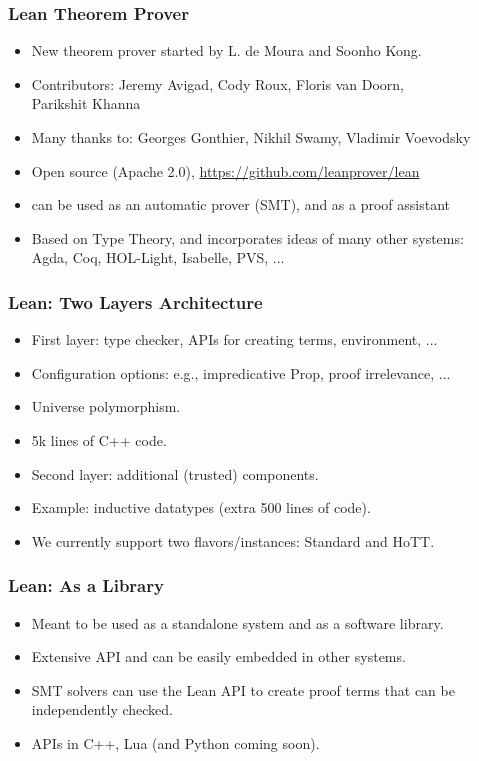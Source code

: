 \documentclass[svgnames,table,mathserif]{beamer}
\begin{document}
\begin{frame}
\frametitle{Lean Theorem Prover}
  \begin{itemize}
    \item New theorem prover started by L. de Moura and Soonho Kong.
    \item {\small Contributors: Jeremy Avigad, Cody Roux, Floris van Doorn,\\ Parikshit Khanna}
    \item {\small Many thanks to: Georges Gonthier, Nikhil Swamy, Vladimir Voevodsky}
  \end{itemize}
  \vspace*{12pt}
  \begin{itemize}
    \item Open source (Apache 2.0), {\small \url{https://github.com/leanprover/lean}}
    \item {\color{red} can be used as an automatic prover (SMT), and as a proof assistant}
    \item Based on {\color{red} Type Theory}, and incorporates ideas of many other systems:\\
        Agda, Coq, HOL-Light, Isabelle, PVS, ...
  \end{itemize}
\end{frame}

\begin{frame}
\frametitle{Lean: Two Layers Architecture}
  \begin{itemize}
     \item {\color{red} First layer}: type checker, APIs for creating terms, environment, ...
     \item Configuration options: e.g., impredicative Prop, proof irrelevance, ...
     \item Universe polymorphism.
     \item 5k lines of C++ code.
  \end{itemize}
  \vspace*{12pt}
  \begin{itemize}
     \item {\color{red} Second layer}: additional (trusted) components.
     \item Example: inductive datatypes (extra 500 lines of code).
     \item We currently support two flavors/instances: {\color{red} Standard} and {\color{red} HoTT}.
  \end{itemize}
\end{frame}

\begin{frame}
\frametitle{Lean: As a Library}
  \begin{itemize}
     \item Meant to be used as a {\color{red} standalone system} and as a {\color{red} software library}.
     \item Extensive API and can be easily embedded in other systems.
     \item SMT solvers can use the Lean API to create proof terms that can be independently checked.
     \item APIs in C++, Lua (and Python coming soon).
  \end{itemize}
\end{frame}
\end{document}
